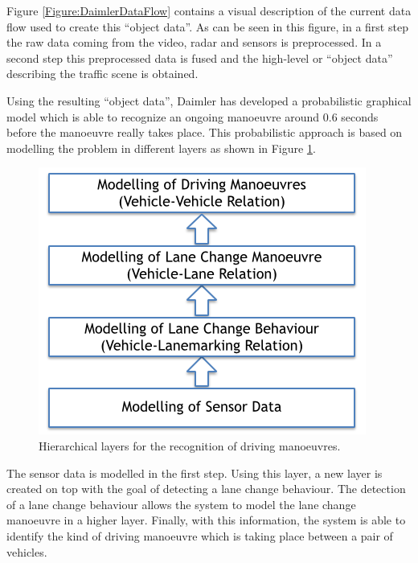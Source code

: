 Figure \ref{Figure:DaimlerDataFlow} contains a visual description of the current data flow used to create this ``object data''.  As can be seen in this figure, in a first step the raw data coming from the video, radar and sensors is preprocessed. In a second step this preprocessed data is fused and the high-level or ``object data'' describing the traffic scene is obtained. 

Using the resulting ``object data'', Daimler has developed a probabilistic graphical model \cite{kasper2012object} which is able to recognize an ongoing manoeuvre around 0.6 seconds before the manoeuvre really takes place. This probabilistic approach is based on modelling the problem in different layers as shown in Figure \ref{Figure:DaimlerHierarchicalModelling}.



\begin{figure}
\begin{center}
\includegraphics[scale=0.58]{./figures/DaimlerHierarchicalModelling}
\caption{\label{Figure:DaimlerHierarchicalModelling} Hierarchical layers for the recognition of driving manoeuvres.}
\end{center}
\end{figure}

The sensor data is modelled in the first step. Using this layer, a new layer is created on top with the goal of detecting a lane change behaviour. The detection of a lane change behaviour allows the system to model the lane change manoeuvre in a higher layer. Finally, with this information, the system is able to identify the kind of driving manoeuvre which is taking place between a pair of vehicles. 



